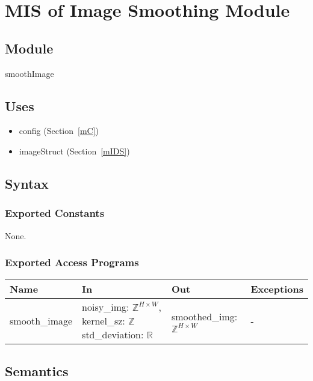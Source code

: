 \documentclass[12pt, titlepage]{article}
\begin{document}
\section{MIS of Image Smoothing Module} \label{mIS}

\subsection{Module}

smoothImage

\subsection{Uses}
\begin{itemize}
  \item config (Section~\ref{mC})
  \item imageStruct (Section~\ref{mIDS})
\end{itemize}

\subsection{Syntax}

\subsubsection{Exported Constants}
None.
\subsubsection{Exported Access Programs}

\begin{center}
\begin{tabular}{p{3cm} p{4cm} p{4cm} p{2cm}}
\hline
\textbf{Name} & \textbf{In} & \textbf{Out} & \textbf{Exceptions} \\
\hline
smooth\_image & 
noisy\_img: $\mathbb{Z}^{H \times W}$, \newline 
kernel\_sz: $\mathbb{Z}$ \newline
std\_deviation: $\mathbb{R}$
 & smoothed\_img: $\mathbb{Z}^{H \times W}$ & - \\
\hline
\end{tabular}
\end{center}

\subsection{Semantics}
\end{document}
